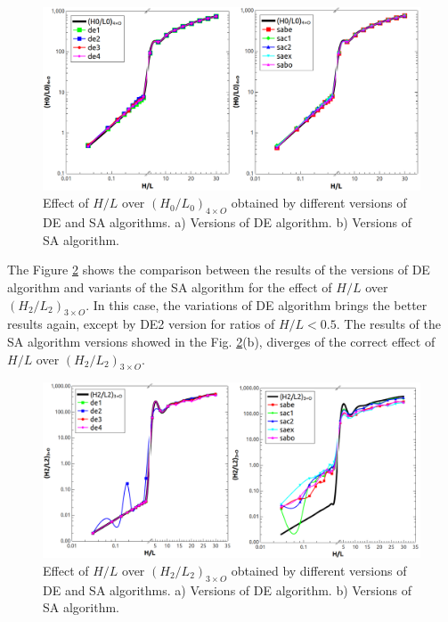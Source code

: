 \documentclass[12pt,fleqn]{article}
\begin{document}
\begin{figure}[H]
\centering
\includegraphics[width=1\linewidth]{imgs/5dof/de_sa_hl_h0l0.png}
\caption{ {\small Effect of $H/L$ over ${(H_{0}/L_{0})_{4\times O}}$ obtained by different versions of DE and SA algorithms.  a) Versions of DE algorithm. b) Versions of SA algorithm.}}
\label{figure05}
\end{figure}
The Figure \ref{figure06} shows the comparison between the results of the versions of DE algorithm and variants of the SA algorithm for the effect of $H/L$ over ${(H_{2}/L_{2})_{3\times O}}$. In this case, the variations of DE algorithm brings the better results again, except by DE2 version for ratios of $H/L< 0.5$. The results of the SA algorithm versions showed in the Fig. \ref{figure06}(b), diverges of the correct effect of $H/L$ over ${(H_{2}/L_{2})_{3\times O}}$.

\begin{figure}[H]
\centering
\includegraphics[width=1\linewidth]{imgs/5dof/de_sa_hl_h2l2.png}
\caption{ {\small Effect of $H/L$ over ${(H_{2}/L_{2})_{3\times O}}$ obtained by different versions of DE and SA algorithms. a) Versions of DE algorithm. b) Versions of SA algorithm.}}
\label{figure06}
\end{figure}
\end{document}

